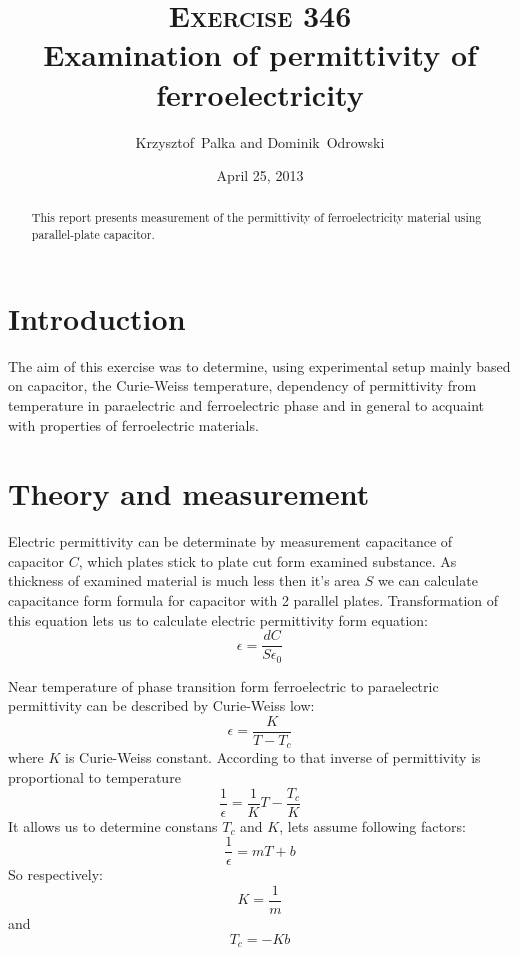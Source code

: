 \documentclass[a4paper,12pt]{article}
\author{Krzysztof~Palka and Dominik~Odrowski}
\date{April 25, 2013}
\title{\textsc{Exercise} 346 \\ Examination of permittivity of ferroelectricity}
\begin{document}
    \maketitle

    \begin{abstract}
        This report presents measurement of the permittivity of ferroelectricity material using parallel-plate capacitor.
    \end{abstract}

    \section{Introduction}
    The aim of this exercise was to determine, using experimental setup mainly based on capacitor, the Curie-Weiss temperature, dependency of permittivity from temperature in paraelectric and ferroelectric phase and in general to acquaint with properties of ferroelectric materials. 

    \section{Theory and measurement}

    

    Electric permittivity can be determinate by measurement capacitance of capacitor $C$, which plates stick to plate cut form examined substance. As thickness of examined material is much less then it's area $S$ we can calculate capacitance form formula for capacitor with 2 parallel plates. Transformation of this equation lets us to calculate electric permittivity form equation:    
    \begin{equation}
        \epsilon = \frac{d C}{S \epsilon_0} \label{eq:epsilon}
    \end{equation}

    Near temperature of phase transition form ferroelectric to paraelectric permittivity can be described by Curie-Weiss low:    
    \begin{equation}
        \epsilon = \frac{K}{T-T_c} \label{eq:curie}
    \end{equation}
    where $K$ is Curie-Weiss constant. According to that inverse of permittivity is proportional to temperature  
    \begin{equation}
        \frac{1}{\epsilon} = \frac{1}{K} T - \frac{T_c}{K} \label{eq:curie2}
    \end{equation}
    It allows us to determine constans $T_c$ and $K$, lets assume following factors:  
    \begin{equation}
        \frac{1}{\epsilon} = mT + b \label{eq:curie3}
    \end{equation}
    So respectively:    
    \begin{equation}
        K = \frac{1}{m} \label{eq:k}
    \end{equation}
    and 
    \begin{equation}
        T_c = - K b \label{eq:tc}
    \end{equation}
    
\end{document}
